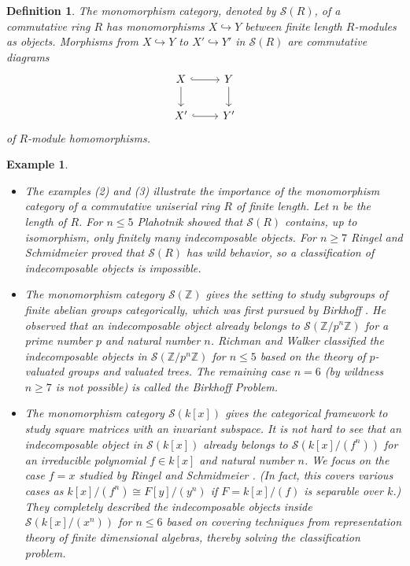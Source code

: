 \documentclass[a4paper]{amsart}
\numberwithin{equation}{section} \theoremstyle{plain}
\numberwithin{thm}{section}
\newtheorem{exa}[thm]{Example}
\newtheorem{df}[thm]{Definition}
\begin{document}
\begin{df} \rm The \emph{monomorphism category}, denoted by $\mathcal{S}(R)$, of a commutative ring $R$ has monomorphisms $X\hookrightarrow Y$ between finite length $R$-modules as objects. Morphisms from $X\hookrightarrow Y$ to $X' \hookrightarrow Y'$ in $\mathcal{S}(R)$ are commutative diagrams
\begin{equation*}
    \begin{tikzcd}
        X \arrow[r, hook] \arrow[d] & Y \arrow[d] \\
        X' \arrow[r, hook] & Y'
    \end{tikzcd}
\end{equation*}
of $R$-module homomorphisms.
\end{df}

\begin{exa}\label{E: main ex}\rm \begin{itemize}
    \item[(1)] The examples (2) and (3) illustrate the importance of the monomorphism category of a commutative uniserial ring $R$ of finite length. Let $n$ be the length of $R$. For $n\leq 5$ Plahotnik \cite{plahotnik} showed that $\mathcal{S}(R)$ contains, up to isomorphism, only finitely many indecomposable objects. For $n \geq 7$ Ringel and Schmidmeier  \cite{RS} proved that $\mathcal{S}(R)$ has wild behavior, so a classification of indecomposable objects is impossible.
    
    \item[(2)] The monomorphism category $\mathcal{S}(\mathbb{Z})$ gives the setting to study subgroups of finite abelian groups categorically, which was first pursued by Birkhoff \cite{birkhoff}. He observed that an indecomposable object already belongs to $\mathcal{S}(\mathbb{Z}/p^n \mathbb{Z})$ for a prime number $p$ and natural number $n$. Richman and Walker \cite{RW, RW2} classified the indecomposable objects in $\mathcal{S}(\mathbb{Z}/p^n \mathbb{Z})$ for $n \leq 5$ based on the theory of $p$-valuated groups and valuated trees. The remaining case $n = 6$ (by wildness $n\geq 7$ is not possible) is called the \emph{Birkhoff Problem}.
    \item[(3)] The monomorphism category $\mathcal{S}(k[x])$ gives the categorical framework to study square matrices with an invariant subspace. It is not hard to see that an indecomposable object in $\mathcal{S}(k[x])$ already belongs to $\mathcal{S}(k[x]/(f^n))$ for an irreducible polynomial $f\in k[x]$ and natural number $n$. We focus on the case $f = x$ studied by Ringel and Schmidmeier \cite{RS2}. (In fact, this covers various cases as $k[x]/(f^n) \cong F[y]/(y^n)$ if $ F =k[x]/(f)$ is separable over $k$.) They completely described the indecomposable objects inside $\mathcal{S}(k[x]/(x^n))$ for $n \leq 6$ based on covering techniques from representation theory of finite dimensional algebras, thereby solving the classification problem.
\end{itemize}
\end{exa}
\end{document}
